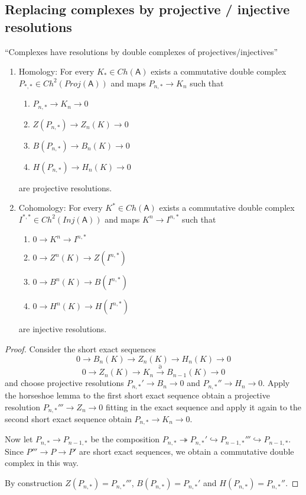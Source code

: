 \documentclass[fontsize=11pt,fleqn,a4paper]{scrartcl}
\begin{document}
\subsection{Replacing complexes by projective / injective resolutions}

\begin{corollary}
\enquote{Complexes have resolutions by double complexes of projectives/injectives}
\begin{multicols}{2}
\begin{enumerate}
\item Homology: For every $K_\ast\in Ch(\mathsf{A})$ exists a commutative double complex $P_{\ast,\ast}\in Ch^2(Proj(\mathsf{A}))$ and maps $P_{n,\ast}\to K_n$ such that 
\begin{enumerate}
\item $P_{n,\ast} \to K_n \to 0$
\item $Z(P_{n,\ast}) \to Z_n(K) \to 0$
\item $B(P_{n,\ast}) \to B_n(K) \to 0$
\item $H(P_{n,\ast}) \to H_n(K) \to 0$
\end{enumerate}
are projective resolutions.
\item Cohomology: For every $K^\ast\in Ch(\mathsf{A})$ exists a commutative double complex $I^{\ast,\ast}\in Ch^2(Inj(\mathsf{A}))$ and maps $K^n\to I^{n,\ast}$ such that \begin{enumerate}
\item $0\to K^n \to I^{n,\ast}$
\item $0\to Z^n(K) \to Z(I^{n,\ast})$
\item $0\to B^n(K) \to B(I^{n,\ast})$
\item $0\to H^n(K) \to H(I^{n,\ast})$
\end{enumerate}
are injective resolutions.
\end{enumerate}
\end{multicols}
\end{corollary}
\begin{proof}
Consider the short exact sequences
\[0\to B_n(K)\to Z_n(K) \to H_n(K)\to 0\]
\[0\to Z_n(K) \to K_n \xrightarrow{\partial} B_{n-1}(K)\to 0\]
and choose projective resolutions $P_{n,\ast}'\to B_n\to 0$ and $P_{n,\ast}''\to H_n\to 0$. Apply the horseshoe lemma to the first short exact sequence obtain a projective resolution $P_{n,\ast}'''\to Z_n\to 0$ fitting in the exact sequence and apply it again to the second short exact sequence obtain $P_{n,\ast} \to K_n \to 0$.

Now let $P_{n,\ast} \to P_{n-1,\ast}$ be the composition $P_{n,\ast} \twoheadrightarrow P_{n,\ast}' \hookrightarrow P_{n-1,\ast}''' \hookrightarrow P_{n-1,\ast}$. Since $P''' \to P \to P'$ are short exact sequences, we obtain a commutative double complex in this way.

By construction $Z(P_{n,\ast}) = P_{n,\ast}'''$, $B(P_{n,\ast}) = P_{n,\ast}'$ and $H(P_{n,\ast}) = P_{n,\ast}''$.
\end{proof}
\end{document}
